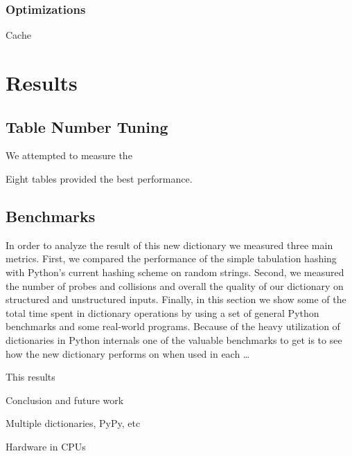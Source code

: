 \documentclass[11pt]{article}
\begin{document}
\subsubsection{Optimizations}

Cache       

\section{Results}
\subsection{Table Number Tuning}

We attempted to measure the 

Eight tables provided the best performance.
\subsection{Benchmarks}
In order to analyze the result of this new dictionary we measured three main metrics. First, we compared the performance of the simple tabulation hashing with Python’s current hashing scheme on random strings. Second, we measured the number of probes and collisions and overall the quality of our dictionary on structured and unstructured inputs. Finally, in this section  we show some of the total time spent in dictionary operations by using a set of general Python benchmarks and some real-world programs.
Because of the heavy utilization of dictionaries in Python internals one of the valuable benchmarks to get is to see how the new dictionary performs on when used in each …




This results 




Conclusion and future work

Multiple dictionaries, PyPy, etc

Hardware in CPUs
\end{document}
